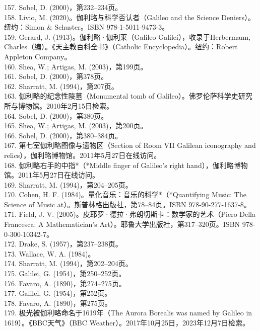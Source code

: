 157. Sobel, D. (2000)，第232–234页。\\
158. Livio, M. (2020)。伽利略与科学否认者（Galileo and the Science Deniers）。纽约：Simon & Schuster。ISBN 978-1-5011-9473-3。\\
159. Gerard, J. (1913)。伽利略·伽利莱（Galileo Galilei），收录于Herbermann, Charles（编）。《天主教百科全书》（Catholic Encyclopedia）。纽约：Robert Appleton Company。\\
160. Shea, W.; Artigas, M. (2003)，第199页。\\
161. Sobel, D. (2000)，第378页。\\
162. Sharratt, M. (1994)，第207页。\\
163. 伽利略的纪念性陵墓（Monumental tomb of Galileo）。佛罗伦萨科学史研究所与博物馆。2010年2月15日检索。\\
164. Sobel, D. (2000)，第380页。\\
165. Shea, W.; Artigas, M. (2003)，第200页。\\
166. Sobel, D. (2000)，第380–384页。\\
167. 第七室伽利略图像与遗物区（Section of Room VII Galilean iconography and relics），伽利略博物馆。2011年5月27日在线访问。\\
168. 伽利略右手的中指*（*Middle finger of Galileo's right hand），伽利略博物馆。2011年5月27日在线访问。\\
169. Sharratt, M. (1994)，第204–205页。\\
170. Cohen, H. F. (1984)。量化音乐：音乐的科学*（*Quantifying Music: The Science of Music at）。斯普林格出版社，第78–84页。ISBN 978-90-277-1637-8。\\
171. Field, J. V. (2005)。皮耶罗·德拉·弗朗切斯卡：数学家的艺术（Piero Della Francesca: A Mathematician's Art）。耶鲁大学出版社，第317–320页。ISBN 978-0-300-10342-7。\\
172. Drake, S. (1957)，第237–238页。\\
173. Wallace, W. A. (1984)。\\
174. Sharratt, M. (1994)，第202–204页。\\
175. Galilei, G. (1954)，第250–252页。\\
176. Favaro, A. (1890)，第274–275页。\\
177. Galilei, G. (1954)，第252页。\\
178. Favaro, A. (1890)，第275页。\\
179. 极光被伽利略命名于1619年（The Aurora Borealis was named by Galileo in 1619）。《BBC天气》（BBC Weather）。2017年10月25日，2023年12月7日检索。\\
